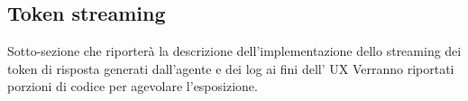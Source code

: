 \subsection{Token streaming}

Sotto-sezione che riporterà la descrizione dell'implementazione dello streaming dei token di risposta generati dall'agente e dei log ai fini dell' UX
Verranno riportati porzioni di codice per agevolare l'esposizione.